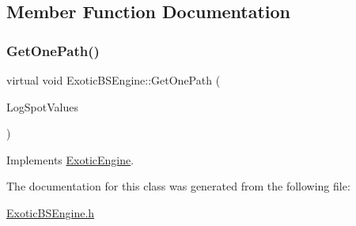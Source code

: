 \subsection{Member Function Documentation}
\hypertarget{classExoticBSEngine_a4f621796857e8cf1b867d66daea2d690}{}\label{classExoticBSEngine_a4f621796857e8cf1b867d66daea2d690} 
\subsubsection{\texorpdfstring{Get\+One\+Path()}{GetOnePath()}}
{\footnotesize\ttfamily virtual void Exotic\+B\+S\+Engine\+::\+Get\+One\+Path (\begin{DoxyParamCaption}\item[{\hyperlink{classMJArray}{M\+J\+Array} \&}]{Log\+Spot\+Values }\end{DoxyParamCaption})\hspace{0.3cm}{\ttfamily [virtual]}}



Implements \hyperlink{classExoticEngine_a1be567d24e89abadb95bb2af7224b54e}{Exotic\+Engine}.



The documentation for this class was generated from the following file\+:\begin{DoxyCompactItemize}
\item 
\hyperlink{ExoticBSEngine_8h}{Exotic\+B\+S\+Engine.\+h}\end{DoxyCompactItemize}
